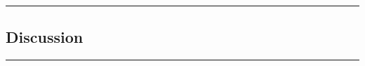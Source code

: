 {\color{gray}\hrule}
\begin{center}
\section{Discussion}
\bigskip
\end{center}
{\color{gray}\hrule}
\begin{multicols}{2}
\lipsum
\end{multicols}
